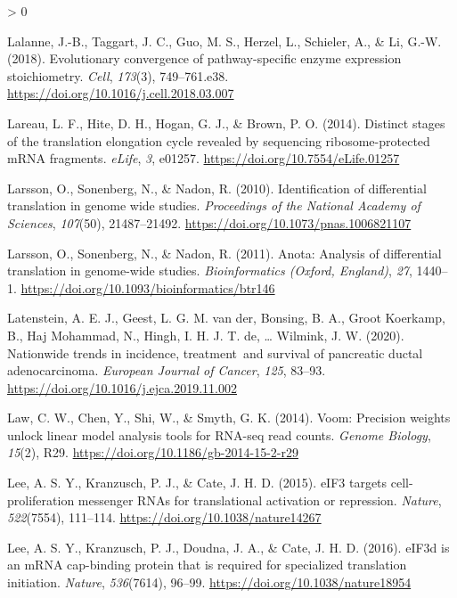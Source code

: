 \documentclass[
  12pt,
  openany]{book}
\newlength{\cslhangindent}
\newenvironment{CSLReferences}[2] %
 {%
  \setlength{\parindent}{0pt}
  \ifodd #1 \everypar{\setlength{\hangindent}{\cslhangindent}}\ignorespaces\fi
  \ifnum #2 > 0
  \setlength{\parskip}{#2\baselineskip}
  \fi
 }%
 {}
\begin{document}
\begin{CSLReferences}{1}{0}
\leavevmode\hypertarget{ref-Lalanne2018}{}%
Lalanne, J.-B., Taggart, J. C., Guo, M. S., Herzel, L., Schieler, A., \& Li, G.-W. (2018). Evolutionary convergence of pathway-specific enzyme expression stoichiometry. \emph{Cell}, \emph{173}(3), 749--761.e38. \url{https://doi.org/10.1016/j.cell.2018.03.007}

\leavevmode\hypertarget{ref-Lareau2014}{}%
Lareau, L. F., Hite, D. H., Hogan, G. J., \& Brown, P. O. (2014). Distinct stages of the translation elongation cycle revealed by sequencing ribosome-protected {mRNA} fragments. \emph{{eLife}}, \emph{3}, e01257. \url{https://doi.org/10.7554/eLife.01257}

\leavevmode\hypertarget{ref-Larsson2010}{}%
Larsson, O., Sonenberg, N., \& Nadon, R. (2010). Identification of differential translation in genome wide studies. \emph{Proceedings of the National Academy of Sciences}, \emph{107}(50), 21487--21492. \url{https://doi.org/10.1073/pnas.1006821107}

\leavevmode\hypertarget{ref-Larsson2011}{}%
Larsson, O., Sonenberg, N., \& Nadon, R. (2011). Anota: Analysis of differential translation in genome-wide studies. \emph{Bioinformatics (Oxford, England)}, \emph{27}, 1440--1. \url{https://doi.org/10.1093/bioinformatics/btr146}

\leavevmode\hypertarget{ref-Latenstein2020}{}%
Latenstein, A. E. J., Geest, L. G. M. van der, Bonsing, B. A., Groot Koerkamp, B., Haj Mohammad, N., Hingh, I. H. J. T. de, \ldots{} Wilmink, J. W. (2020). Nationwide trends in incidence, treatment~and survival of pancreatic ductal adenocarcinoma. \emph{European Journal of Cancer}, \emph{125}, 83--93. \url{https://doi.org/10.1016/j.ejca.2019.11.002}

\leavevmode\hypertarget{ref-Law2014}{}%
Law, C. W., Chen, Y., Shi, W., \& Smyth, G. K. (2014). Voom: Precision weights unlock linear model analysis tools for {RNA}-seq read counts. \emph{Genome Biology}, \emph{15}(2), R29. \url{https://doi.org/10.1186/gb-2014-15-2-r29}

\leavevmode\hypertarget{ref-Lee2015}{}%
Lee, A. S. Y., Kranzusch, P. J., \& Cate, J. H. D. (2015). {eIF}3 targets cell-proliferation messenger {RNAs} for translational activation or repression. \emph{Nature}, \emph{522}(7554), 111--114. \url{https://doi.org/10.1038/nature14267}

\leavevmode\hypertarget{ref-Lee2016}{}%
Lee, A. S. Y., Kranzusch, P. J., Doudna, J. A., \& Cate, J. H. D. (2016). {eIF}3d is an {mRNA} cap-binding protein that is required for specialized translation initiation. \emph{Nature}, \emph{536}(7614), 96--99. \url{https://doi.org/10.1038/nature18954}


\end{CSLReferences}
\end{document}
